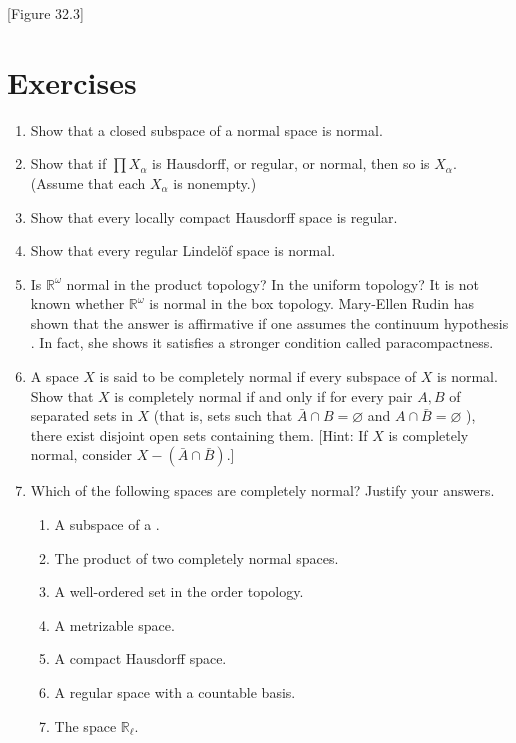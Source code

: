 [Figure 32.3]
\section*{Exercises}
\begin{enumerate}[itemsep=0.4em, parsep=0pt, topsep=0pt, partopsep=0pt, leftmargin=*, label=\arabic*., ref=\arabic*]
\item Show that a closed subspace of a normal space is normal.
\item Show that if \(\prod {X}_{\alpha }\) is Hausdorff, or regular, or normal, then so is \(X_{\alpha }\). (Assume that each \(X_{\alpha }\) is nonempty.)
\item Show that every locally compact Hausdorff space is regular.
\item Show that every regular Lindelöf space is normal.
\item Is \(\mathbb{R}^{\omega }\) normal in the product topology? In the uniform topology? It is not known whether \(\mathbb{R}^{\omega }\) is normal in the box topology. Mary-Ellen Rudin has shown that the answer is affirmative if one assumes the continuum hypothesis \cite{Rudin1972}. In fact, she shows it satisfies a stronger condition called paracompactness.
\item A space \(X\) is said to be completely normal if every subspace of \(X\) is normal. Show that \(X\) is completely normal if and only if for every pair \(A,B\) of separated sets in \(X\) (that is, sets such that \(\bar{A} \cap B = \varnothing\) and \(A \cap \bar{B} = \varnothing\) ), there exist disjoint open sets containing them. [Hint: If \(X\) is completely normal, consider \(X - ( {\bar{A} \cap \bar{B}})\).]
\item Which of the following spaces are completely normal? Justify your answers.
 \begin{enumerate}[itemsep=0.2em, parsep=0pt, topsep=0pt, partopsep=0pt, leftmargin=*, label=(\alph*), align=left]
 \item A subspace of a .
 \item The product of two completely normal spaces.
 \item A well-ordered set in the order topology.
 \item A metrizable space.
 \item A compact Hausdorff space.
 \item A regular space with a countable basis.
 \item The space \(\mathbb{R}_{\ell }\).

\end{enumerate}
\end{enumerate}
